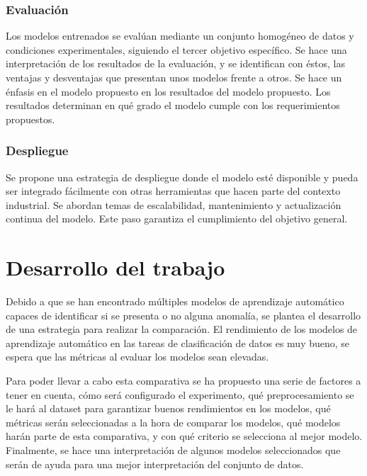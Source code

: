 \documentclass[11pt,a4paper,spanish]{book}
\numberwithin{equation}{chapter}
\numberwithin{figure}{chapter}
\begin{document}
\subsection{Evaluación}

Los modelos entrenados se evalúan mediante un conjunto homogéneo de datos y condiciones 
experimentales, siguiendo el tercer objetivo específico. Se hace una interpretación de 
los resultados de la evaluación, y se identifican con éstos, las ventajas y desventajas 
que presentan unos modelos frente a otros. 
Se hace un énfasis en el modelo propuesto en los resultados del modelo propuesto. 
Los resultados determinan en qué grado el modelo cumple con los requerimientos propuestos. 

\subsection{Despliegue}

Se propone una estrategia de despliegue donde el modelo esté disponible y pueda ser 
integrado fácilmente con otras herramientas que hacen parte del contexto industrial. 
Se abordan temas de escalabilidad, mantenimiento y actualización continua del modelo. 
Este paso garantiza el cumplimiento del objetivo general. 



\chapter{Desarrollo del trabajo}

Debido a que se han encontrado múltiples modelos de aprendizaje automático capaces de identificar si se presenta o no alguna anomalía, se plantea el desarrollo de una estrategia para realizar la comparación. El rendimiento de los modelos de aprendizaje automático en las tareas de clasificación de datos es muy bueno, se espera que las métricas al evaluar los modelos sean elevadas. 


Para poder llevar a cabo esta comparativa se ha propuesto una serie de factores a tener en cuenta, cómo será configurado el experimento, qué preprocesamiento se le hará al dataset para garantizar buenos rendimientos en los modelos, qué métricas serán seleccionadas a la hora de comparar los modelos, qué modelos harán parte de esta comparativa, y con qué criterio se selecciona al mejor modelo. Finalmente, se hace una interpretación de algunos modelos seleccionados que serán de ayuda para una mejor interpretación del conjunto de datos. 
\end{document}
